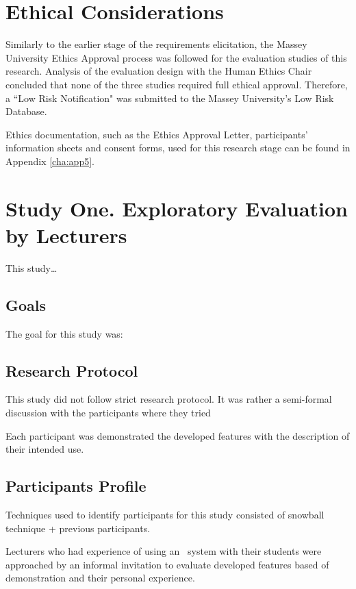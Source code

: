 \section{Ethical Considerations}

Similarly to the earlier stage of the requirements elicitation, the Massey
University Ethics Approval process was followed for the evaluation studies of
this research. Analysis of the evaluation design with the Human Ethics Chair
concluded that none of the three studies required full ethical approval.
Therefore, a ``Low Risk Notification" was submitted to the Massey University's
Low Risk Database.

Ethics documentation, such as the Ethics Approval Letter, participants'
information sheets and consent forms, used for this research stage can be found
in Appendix \ref{cha:app5}.

\section{Study One. Exploratory Evaluation by Lecturers}
\label{sec:one}

This study\ldots

\subsection{Goals}

The goal for this study was:


\subsection{Research Protocol}

This study did not follow strict research protocol. It was rather a semi-formal
discussion with the participants where they tried

Each participant was demonstrated the developed features with the description of
their intended use.

\subsection{Participants Profile}

Techniques used to identify participants for this study consisted of snowball
technique + previous participants.

Lecturers who had experience of using an \ep~system with their students were
approached by an informal invitation to evaluate developed features based of
demonstration and their personal experience.

